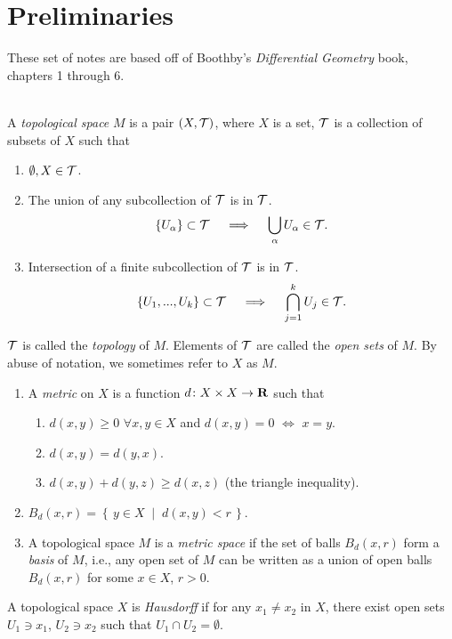 \chapter{Preliminaries}
These set of notes are based off of Boothby's \emph{Differential Geometry}
book, chapters 1 through 6.
\\\\
\begin{definition}
A \emph{topological space} $M$ is a pair $(X,\mathcal{T})$, where $X$ is a set,
$\mathcal{T}$ is a collection of subsets of $X$ such that
\begin{enumerate}[label=(\alph*)]
\item $\emptyset,X\in\mathcal{T}$.
\item The union of any subcollection of $\mathcal{T}$ is in $\mathcal{T}$.
\[
\left\{U_\alpha\right\}\subset\mathcal{T}
\quad\implies\quad
\bigcup_\alpha U_\alpha\in\mathcal{T}.\]
\item Intersection of a finite subcollection of $\mathcal{T}$ is in $\mathcal{T}$.
\[\left\{U_1,...,U_k\right\}\subset\mathcal{T}
\quad\implies\quad
\bigcap_{j=1}^k U_j\in\mathcal{T}.\]
\end{enumerate}
$\mathcal{T}$ is called the \emph{topology} of $M$. Elements of $\mathcal{T}$ are
called the \emph{open sets} of $M$. By abuse of notation, we sometimes
refer to $X$ as $M$.
\end{definition}
\begin{definition}
\begin{enumerate}[label=(\alph*)]
\item A \emph{metric} on $X$ is a function $d\colon X\times X\to\mathbf{R}$ such
  that
  \begin{enumerate}[label=(\arabic*)]
  \item $d(x,y)\geq 0$ $\forall x,y\in X$ and $d(x,y)=0$ $\iff$ $x=y$.
  \item $d(x,y)=d(y,x)$.
  \item $d(x,y)+d(y,z)\geq d(x,z)$ (the triangle inequality).
  \end{enumerate}
\item $B_d(x,r)=\left\{\,y\in X\;\middle|\;d(x,y)<r\,\right\}$.
\item A topological space $M$ is a \emph{metric space} if the set of balls
  $B_d(x,r)$ form a \emph{basis} of $M$, i.e., any open set of $M$ can be
  written as a union of open balls $B_d(x,r)$ for some $x\in X$, $r>0$.
\end{enumerate}
\end{definition}

\begin{definition}
A topological space $X$ is \emph{Hausdorff} if for any $x_1\neq x_2$ in
$X$, there exist open sets $U_1\ni x_1$, $U_2\ni x_2$ such that $U_1\cap
U_2=\emptyset$.
\end{definition}

